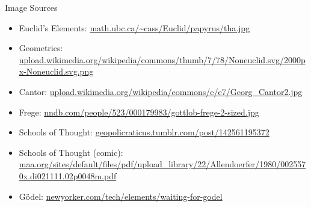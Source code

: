 \documentclass{beamer}
\begin{document}
\begin{frame}[allowframebreaks]{Image Sources}
\begin{itemize}
\item Euclid's Elements: \url{math.ubc.ca/~cass/Euclid/papyrus/tha.jpg}
\item Geometries: \url{upload.wikimedia.org/wikipedia/commons/thumb/7/78/Noneuclid.svg/2000px-Noneuclid.svg.png}
\item Cantor: \url{upload.wikimedia.org/wikipedia/commons/e/e7/Georg_Cantor2.jpg}
\item Frege: \url{nndb.com/people/523/000179983/gottlob-frege-2-sized.jpg}
\item Schools of Thought: \url{geopolicraticus.tumblr.com/post/142561195372}
\item Schools of Thought (comic): \url{maa.org/sites/default/files/pdf/upload\_library/22/Allendoerfer/1980/0025570x.di021111.02p0048m.pdf}
\item Gödel: \url{newyorker.com/tech/elements/waiting-for-godel}
\end{itemize}
\end{frame}
\end{document}
